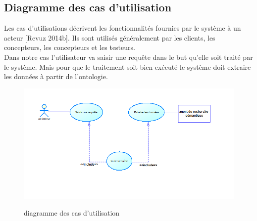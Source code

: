         \subsection{Diagramme des cas d'utilisation}
            Les cas d'utilisations décrivent les fonctionnalités fournies par le système à un acteur [Revuz 2014b]. Ils sont utilisés généralement par les clients, les concepteurs, les concepteurs et les testeurs.\\
            Dans notre cas l'utilisateur va saisir une requête dans le but qu'elle soit traité par le système. Mais pour que le traitement soit bien exécuté le système doit extraire les données à partir de l'ontologie.
            \begin{figure}[H]
                    \centering
                    \includegraphics[width=20cm]{cas_utilisation}\\
                    \caption{diagramme des cas d'utilisation}\label{diagramme des cas d'utilisation}
            \end{figure}
